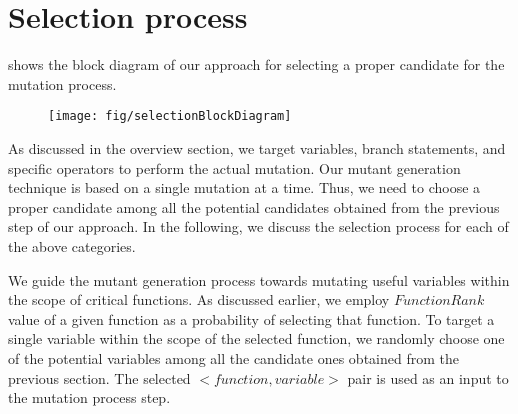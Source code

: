 \section{Selection process} \label{selection}
 shows the block diagram of our approach for selecting a proper candidate for the mutation process.

\begin{figure}
\centering
\texttt{[image: fig/selectionBlockDiagram]}
\label{Fig:selectionBlockDiagram}
\end{figure}

As discussed in the overview section, we target variables, branch statements, and \javascript specific operators to perform the actual mutation. Our mutant generation technique is based on a single mutation at a time. Thus, we need to choose a proper candidate among all the potential candidates obtained from the previous step of our approach.
In the following, we discuss the selection process for each of the above categories.

 We guide the mutant generation process towards mutating useful variables within the scope of critical functions. As discussed earlier, we employ $FunctionRank$ value of a given function as a probability of selecting that function. To target a single variable within the scope of the selected function, we randomly choose
one of the potential variables among all the candidate ones obtained from the previous section. The selected $<function,variable>$ pair
is used as an input to the mutation process step.  

